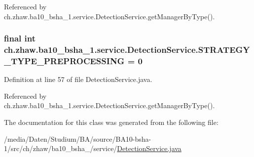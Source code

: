Referenced by ch.zhaw.ba10\_\-bsha\_\-1.service.DetectionService.getManagerByType().\hypertarget{classch_1_1zhaw_1_1ba10__bsha__1_1_1service_1_1DetectionService_a618391553bffc271f3d62fc4b1705c34}{
\subsubsection[{STRATEGY\_\-TYPE\_\-PREPROCESSING}]{\setlength{\rightskip}{0pt plus 5cm}final int {\bf ch.zhaw.ba10\_\-bsha\_\-1.service.DetectionService.STRATEGY\_\-TYPE\_\-PREPROCESSING} = 0}}
\label{classch_1_1zhaw_1_1ba10__bsha__1_1_1service_1_1DetectionService_a618391553bffc271f3d62fc4b1705c34}


Definition at line 57 of file DetectionService.java.

Referenced by ch.zhaw.ba10\_\-bsha\_\-1.service.DetectionService.getManagerByType().

The documentation for this class was generated from the following file:\begin{DoxyCompactItemize}
\item 
/media/Daten/Studium/BA/source/BA10-\/bsha-\/1/src/ch/zhaw/ba10\_\-bsha\_/service/\hyperlink{DetectionService_8java}{DetectionService.java}\end{DoxyCompactItemize}
